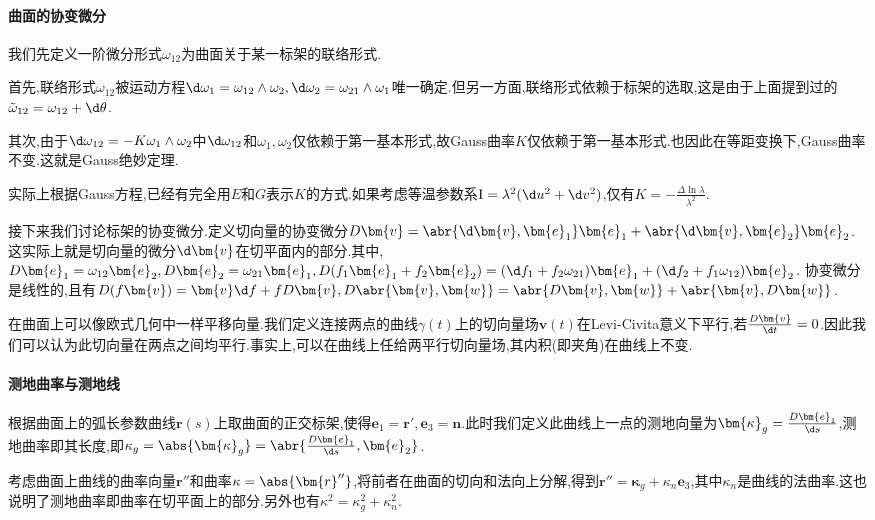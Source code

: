 \documentclass{article}
\begin{document}
\paragraph{曲面的协变微分}
我们先定义一阶微分形式$\omega_{12}$为曲面关于某一标架的联络形式.

首先,联络形式$\omega_{12}$被运动方程$\d \omega_1=\omega_{12}\wedge\omega_2,\d\omega_2=\omega_{21}\wedge\omega_1$唯一确定.但另一方面,联络形式依赖于标架的选取,这是由于上面提到过的$\tilde{\omega}_{12}=\omega_{12}+\d \theta$.

其次,由于$\d\omega_{12}=-K\omega_1\wedge\omega_2$中$\d \omega_{12}$和$\omega_1,\omega_2$仅依赖于第一基本形式,故Gauss曲率$K$仅依赖于第一基本形式.也因此在等距变换下,Gauss曲率不变.这就是Gauss绝妙定理.

实际上根据Gauss方程,已经有完全用$E$和$G$表示$K$的方式.如果考虑等温参数系$\mathrm{I}=\lambda^2(\d u^2+\d v^2)$,仅有$K=-\frac{\Delta\ln\lambda}{\lambda^2}$.

接下来我们讨论标架的协变微分.定义切向量的协变微分$D\bm{v}=\abr{\d \bm{v},\bm{e}_1}\bm{e}_1+\abr{\d \bm{v},\bm{e}_2}\bm{e}_2$.这实际上就是切向量的微分$\d \bm{v}$在切平面内的部分.其中,$D\bm{e}_1=\omega_{12}\bm{e}_2,D\bm{e}_2=\omega_{21}\bm{e}_1,D(f_1\bm{e}_1+f_2\bm{e}_2)=(\d f_1+f_2\omega_{21})\bm{e}_1+(\d f_2+f_1\omega_{12})\bm{e}_2$.
协变微分是线性的,且有$D(f\bm{v})=\bm{v}\d f+fD\bm{v},D\abr{\bm{v},\bm{w}}=\abr{D\bm{v},\bm{w}}+\abr{\bm{v},D\bm{w}}$.

在曲面上可以像欧式几何中一样平移向量.我们定义连接两点的曲线$\gamma(t)$上的切向量场$\bm{v}(t)$在Levi-Civita意义下平行,若$\frac{D\bm{v}}{\d t}=0$.因此我们可以认为此切向量在两点之间均平行.事实上,可以在曲线上任给两平行切向量场,其内积(即夹角)在曲线上不变.

\paragraph{测地曲率与测地线}
根据曲面上的弧长参数曲线$\bm{r}(s)$上取曲面的正交标架,使得$\bm{e}_1=\bm{r}',\bm{e}_3=\bm{n}$.此时我们定义此曲线上一点的测地向量为$\bm{\kappa}_g=\frac{D\bm{e}_1}{\d s}$,测地曲率即其长度,即$\kappa_g=\abs{\bm{\kappa}_g}=\abr{\frac{D\bm{e}_1}{\d s},\bm{e}_2}$.

考虑曲面上曲线的曲率向量$\bm{r}''$和曲率$\kappa=\abs{\bm{r}''}$,将前者在曲面的切向和法向上分解,得到$\bm{r}''=\bm{\kappa}_g+\kappa_n\bm{e}_3$,其中$\kappa_n$是曲线的法曲率.这也说明了测地曲率即曲率在切平面上的部分.另外也有$\kappa^2=\kappa_g^2+\kappa_n^2$.
\end{document}
